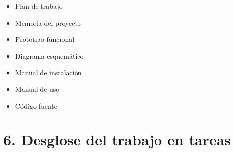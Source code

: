 \documentclass[11pt]{charter}
\begin{document}
\begin{itemize}
\item Plan de trabajo
\item Memoria del proyecto
\item Prototipo funcional
\item Diagrama esquemático
\item Manual de instalación
\item Manual de uso
\item Código fuente
 
\end{itemize}

\section{6. Desglose del trabajo en tareas}
\label{sec:wbs}
\end{document}
